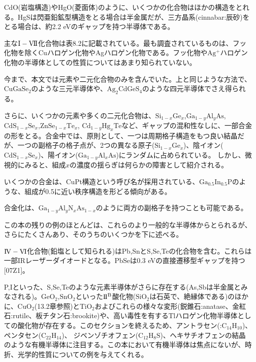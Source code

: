 \documentclass[11pt,a4j,uplatex]{jsarticle}
\begin{document}
CdO(岩塩構造)やHgO(菱面体)のように、いくつかの化合物はほかの構造をとれる。HgSは閃亜鉛鉱型構造をとる場合は半金属だが、三方晶系(cinnabar:辰砂)をとる場合は、約2.2 eVのギャップを持つ半導体である。

主な$\mathrm{I-V\hspace{-1pt}I\hspace{-1pt}I}$化合物は表8.2に記載されている。最も調査されているものは、フッ化物を除くCuハロゲン化物やAgハロゲン化物である。フッ化物や$\mathrm{Ag^+}$ハロゲン化物の半導体としての性質についてはあまり知られていない。

今まで、本文では元素や二元化合物のみを含んでいた。上と同じような方法で、$\mathrm{CuGaSe_2}$のような三元半導体や、$\mathrm{Ag_2CdGeS_4}$のような四元半導体でさえ得られる。

さらに、いくつかの元素や多くの二元化合物は、$\mathrm{Si}_{1-x}\mathrm{Ge}_{x}$,$\mathrm{Ga}_{1-y}\mathrm{Al}_{y}\mathrm{As}$,$\mathrm{Cd}\mathrm{S}_{1-x}\mathrm{Se}_{x}$,$\mathrm{Zn}\mathrm{Se}_{1-x}\mathrm{Te}_{x}$,
$\mathrm{Cd}_{1-y}\mathrm{Hg}_{x}\mathrm{Te}$など、ギャップの混和性なしに、一部合金の形をとる。合金中では、原則として、一つは周期格子構造をもつ良い結晶だが、一つの副格子の格子点が、2つの異なる原子($\mathrm{Si}_{1-x}\mathrm{Ge}_{x}$)、陰イオン($\mathrm{Cd}\mathrm{S}_{1-x}\mathrm{Se}_{x}$)、陽イオン($\mathrm{Ga}_{1-y}\mathrm{Al}_{x}\mathrm{As}$)にランダムに占められている。
しかし、微視的にみると、組成$x$の濃度の揺らぎは何らかの障害として紹介される。

いくつかの合金は、CuPt構造という呼び名が採用されている、$\mathrm{Ga}_{0.5}\mathrm{In}_{0.5}\mathrm{P}$のような、組成が0.5に近い秩序構造を形どる傾向がある。

合金化は、$\mathrm{Ga}_{1-y}\mathrm{Al}_{y}\mathrm{N}_{x}\mathrm{As}_{1-x}$のように両方の副格子を持つことも可能である。

この本の残りの例のほとんどは、これらのより一般的な半導体からとられるが、さらにたくさんあり、そのうちのいくつかを下に述べる。

$\mathrm{I\hspace{-1pt}V-V\hspace{-1pt}I}$化合物(鉛塩として知られる)はPb,SnとS,Se,Teの化合物を含む。これらは一部IRレーザーダイオードとなる。PbSeは0.3 eVの直接遷移型ギャップを持つ[07Z1]。

P,Iといった、S,Se,Teのような元素半導体がさらに存在する(As,Sbは半金属とみなされる)。$\mathrm{GeO_2}$,$\mathrm{SnO_2}$といった$\mathrm{I\hspace{-1pt}I^B}$酸化物($\mathrm{SiO_2}$は石英で、絶縁体である)のほかに、$\mathrm{CuO_2}$(13.2章参照)と$\mathrm{TiO_2}$およびこれらの様々な変形(鋭錐石:anatase、金紅石:rutile、板チタン石:brookite)や、高い毒性を有するTlハロゲン化物半導体としての酸化物が存在する。このセクションを終えるため、アントラセン(:$\mathrm{C_{14}H_{10}}$)、ペンタセン($\mathrm{C_{22}H_{14}}$)、%
ジベンゾチオフェン($\mathrm{C_{12}H_{8}S}$)、ヘキサチオフェンの結晶のような有機半導体に注目する。この本において有機半導体は焦点にないが、時折、光学的性質についての例を与えてくれる。
\end{document}
